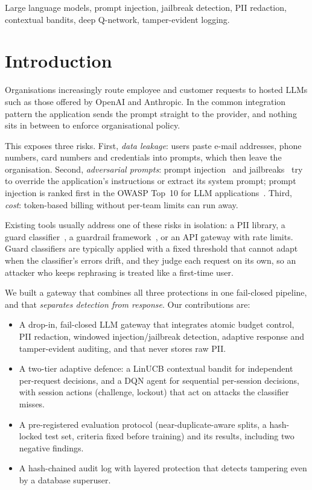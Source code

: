 \documentclass[conference]{IEEEtran}
\begin{document}
\begin{IEEEkeywords}
Large language models, prompt injection, jailbreak detection, PII
redaction, contextual bandits, deep Q-network, tamper-evident logging.
\end{IEEEkeywords}

\section{Introduction}

Organisations increasingly route employee and customer requests to hosted
LLMs such as those offered by OpenAI and Anthropic. In the common
integration pattern the application sends the prompt straight to the
provider, and nothing sits in between to enforce organisational policy.

This exposes three risks. First, \emph{data leakage}: users paste e-mail
addresses, phone numbers, card numbers and credentials into prompts, which
then leave the organisation. Second, \emph{adversarial prompts}: prompt
injection~\cite{perez2022ignore,greshake2023not,liu2023prompt} and
jailbreaks~\cite{wei2023jailbroken,shen2024dan} try to override the
application's instructions or extract its system prompt; prompt injection
is ranked first in the OWASP Top~10 for LLM applications~\cite{owasp2025}.
Third, \emph{cost}: token-based billing without per-team limits can run
away.

Existing tools usually address one of these risks in isolation: a PII
library, a guard classifier~\cite{inan2023llamaguard}, a guardrail
framework~\cite{rebedea2023nemo}, or an API gateway with rate limits. Guard
classifiers are typically applied with a fixed threshold that cannot adapt
when the classifier's errors drift, and they judge each request on its own,
so an attacker who keeps rephrasing is treated like a first-time user.

We built a gateway that combines all three protections in one fail-closed
pipeline, and that \emph{separates detection from response}. Our
contributions are:
\begin{itemize}
\item A drop-in, fail-closed LLM gateway that integrates atomic budget
control, PII redaction, windowed injection/jailbreak detection, adaptive
response and tamper-evident auditing, and that never stores raw PII.
\item A two-tier adaptive defence: a LinUCB contextual bandit for
independent per-request decisions, and a DQN agent for sequential
per-session decisions, with session actions (challenge, lockout) that act
on attacks the classifier misses.
\item A pre-registered evaluation protocol (near-duplicate-aware splits, a
hash-locked test set, criteria fixed before training) and its results,
including two negative findings.
\item A hash-chained audit log with layered protection that detects
tampering even by a database superuser.
\end{itemize}
\end{document}
